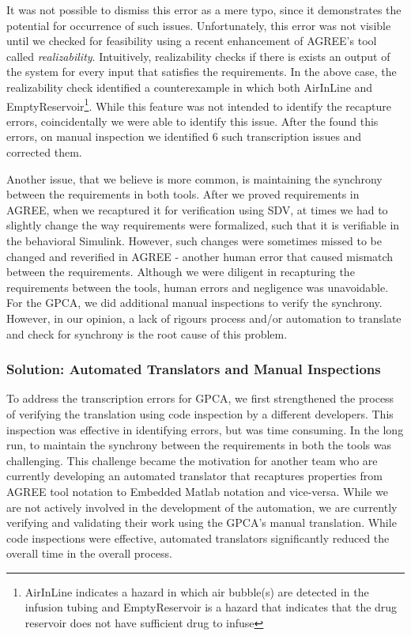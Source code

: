 It was not possible to dismiss this error as a mere typo, since it demonstrates the potential for occurrence of such issues. Unfortunately, this error was not visible until we checked for feasibility using a recent enhancement of AGREE's tool called \emph{realizability}. Intuitively, realizability checks if there is exists an output of the system for every input that satisfies the requirements. In the above case, the realizability check identified a counterexample in which both AirInLine and EmptyReservoir\footnote{AirInLine indicates a hazard in which air bubble(s) are detected in the infusion tubing and EmptyReservoir is a hazard that indicates that the drug reservoir does not have sufficient drug to infuse}. While this feature was not intended to identify the recapture errors, coincidentally we were able to identify this issue. After the found this errors, on manual inspection we identified 6 such transcription issues and corrected them.

Another issue, that we believe is more common, is maintaining the synchrony between the requirements in both tools. After we proved requirements in AGREE, when we recaptured it for verification using SDV, at times we had to slightly change the way requirements were formalized, such that it is verifiable in the behavioral Simulink. However, such changes were sometimes missed to be changed and reverified in AGREE - another human error that caused mismatch between the requirements. Although we were diligent in recapturing the requirements between the tools, human errors and negligence was unavoidable. For the GPCA, we did additional manual inspections to verify the synchrony. However, in our opinion, a lack of rigours process and/or automation to translate and check for synchrony is the root cause of this problem. %

\subsubsection {Solution: Automated Translators and Manual Inspections}

To address the transcription errors for GPCA, we first strengthened the process of verifying the translation using code inspection by a different developers. This inspection was effective in identifying errors, but was time consuming. In the long run, to maintain the synchrony between the requirements in both the tools was challenging. This challenge became the motivation for another team who are currently developing an automated translator that recaptures properties from AGREE tool notation to Embedded Matlab notation and vice-versa. While we are not actively involved in the development of the automation, we are currently verifying and validating their work using the GPCA's manual translation. While code inspections were effective, automated translators significantly reduced the overall time in the overall process. 